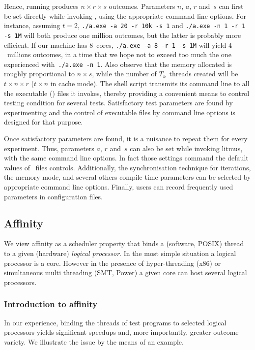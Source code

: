 Hence, running  produces $n \times r \times s$ outcomes.
Parameters $n$, $a$, $r$ and~$s$ can first be set directly while
invoking , using the appropriate command line options.
For instance, assuming $t=2$,
\verb+./a.exe -a 20 -r 10k -s 1+ and \verb+./a.exe -n 1 -r 1 -s 1M+
will both produce one million outcomes, but the latter is probably
more efficient.
If our machine has $8$~cores,
\verb+./a.exe -a 8 -r 1 -s 1M+ will yield $4$~millions outcomes,
in a time that we hope not to exceed too much the one experienced
with~\verb+./a.exe -n 1+.
Also observe that the memory allocated is roughly proportional
to $n \times s$, while the number of $T_k$~threads created will be
$t \times n \times r$ ($t \times n$ in cache mode).
The  shell script transmits its command line to all
the executable () files
it invokes, thereby providing a convenient means
to control testing condition for several tests.
Satisfactory test parameters are found by experimenting and
the control of executable files by command line options is designed for
that purpose.

Once satisfactory parameters are found, it is a nuisance to repeat them
for every experiment.
Thus, parameters $a$, $r$ and~$s$ can also be set while invoking litmus,
with the same command line options. In fact those settings command
the default values of ~files controls.
Additionally, the synchronisation technique for iterations,
the memory mode, and several others compile time parameters
can be selected by appropriate \litmus{} command line options.
Finally, users can record frequently used parameters in configuration files.

\subsection{Affinity\label{sec:affinity}}

We view affinity as
a scheduler property that binds a (software, POSIX) thread to
a given (hardware) \emph{logical processor}.
In the most simple situation a logical processor is a core.
However in the presence of hyper-threading (x86) or simultaneous multi threading
(SMT, Power) a given core can host several logical processors.

\subsubsection{Introduction to affinity}
In our experience,
binding the threads of test programs to selected logical processors
yields significant speedups and, more importantly, greater outcome variety.
We illustrate the issue by the means of an example.

